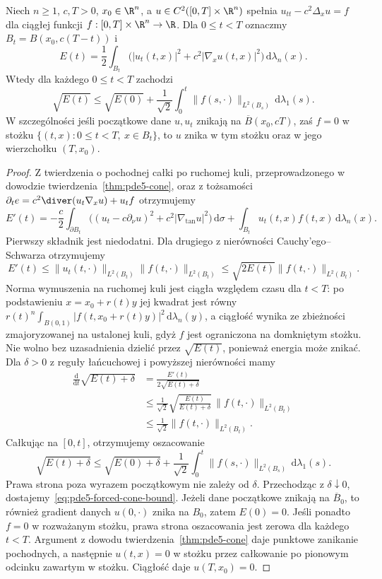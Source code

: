 \begin{twierdzenie}
\label{thm:pde5-cone-forcing}
Niech $n\ge1$, $c,T>0$, $x_0\in\R^n$, a
$u\in C^2([0,T]\times\R^n)$ spełnia
$u_{tt}-c^2\Delta_xu=f$ dla ciągłej funkcji
$f:[0,T]\times\R^n\to\R$.
Dla $0\le t<T$ oznaczmy $B_t=B(x_0,c(T-t))$ i
\[
 E(t)=\frac12\int_{B_t}
 \bigl(|u_t(t,x)|^2+c^2|\nabla_xu(t,x)|^2\bigr)
 \,\mathrm d\lambda_n(x).
\]
Wtedy dla każdego $0\le t<T$ zachodzi
\begin{equation}\label{eq:pde5-forced-cone-bound}
 \sqrt{E(t)}\le\sqrt{E(0)}+
 \frac1{\sqrt2}\int_0^t
 \|f(s,\cdot)\|_{L^2(B_s)}\,\mathrm d\lambda_1(s).
\end{equation}
W szczególności jeśli początkowe dane $u,u_t$ znikają
na $\overline B(x_0,cT)$, zaś $f=0$ w stożku
$\{(t,x):0\le t<T,\ x\in B_t\}$, to $u$ znika
w tym stożku oraz w jego wierzchołku $(T,x_0)$.
\end{twierdzenie}
\begin{proof}
Z twierdzenia o pochodnej całki po ruchomej kuli,
przeprowadzonego w dowodzie twierdzenia~\ref{thm:pde5-cone},
oraz z tożsamości
$\partial_t e=c^2\diver(u_t\nabla_xu)+u_tf$
otrzymujemy
\[
 E'(t)=-\frac c2\int_{\partial B_t}
 \bigl((u_t-c\partial_\nu u)^2+
 c^2|\nabla_{\tan}u|^2\bigr)\,\mathrm d\sigma
 +\int_{B_t}u_t(t,x)f(t,x)\,\mathrm d\lambda_n(x).
\]
Pierwszy składnik jest niedodatni. Dla drugiego
z nierówności Cauchy'ego--Schwarza otrzymujemy
\[
 E'(t)\leq
 \|u_t(t,\cdot)\|_{L^2(B_t)}\|f(t,\cdot)\|_{L^2(B_t)}
 \leq\sqrt{2E(t)}\|f(t,\cdot)\|_{L^2(B_t)}.
\]
Norma wymuszenia na ruchomej kuli jest ciągła
względem czasu dla $t<T$: po podstawieniu
$x=x_0+r(t)y$ jej kwadrat jest równy
$r(t)^n\int_{B(0,1)}|f(t,x_0+r(t)y)|^2
\,\mathrm d\lambda_n(y)$, a ciągłość wynika
ze zbieżności zmajoryzowanej na ustalonej kuli,
gdyż $f$ jest ograniczona na domkniętym stożku.
Nie wolno bez uzasadnienia dzielić przez $\sqrt{E(t)}$,
ponieważ energia może znikać. Dla $\delta>0$
z reguły łańcuchowej i powyższej nierówności mamy
\[
 \begin{aligned}
 \frac{\mathrm d}{\mathrm dt}\sqrt{E(t)+\delta}
 &=\frac{E'(t)}{2\sqrt{E(t)+\delta}}\\
 &\leq\frac1{\sqrt2}\sqrt{\frac{E(t)}{E(t)+\delta}}\,
       \|f(t,\cdot)\|_{L^2(B_t)}\\
 &\leq\frac1{\sqrt2}\|f(t,\cdot)\|_{L^2(B_t)}.
 \end{aligned}
\]
Całkując na $[0,t]$, otrzymujemy oszacowanie
\[
 \sqrt{E(t)+\delta}
 \leq\sqrt{E(0)+\delta}
 +\frac1{\sqrt2}\int_0^t
 \|f(s,\cdot)\|_{L^2(B_s)}\,\mathrm d\lambda_1(s).
\]
Prawa strona poza wyrazem początkowym nie zależy
od $\delta$. Przechodząc z $\delta\downarrow0$,
dostajemy~\eqref{eq:pde5-forced-cone-bound}.
Jeżeli dane początkowe znikają na $\overline B_0$,
to również gradient danych $u(0,\cdot)$ znika na
$B_0$, zatem $E(0)=0$. Jeśli ponadto $f=0$
w rozważanym stożku, prawa strona oszacowania
jest zerowa dla każdego $t<T$. Argument z
dowodu twierdzenia~\ref{thm:pde5-cone} daje
punktowe zanikanie pochodnych, a następnie
$u(t,x)=0$ w stożku przez całkowanie po pionowym
odcinku zawartym w stożku. Ciągłość daje
$u(T,x_0)=0$.
\end{proof}

